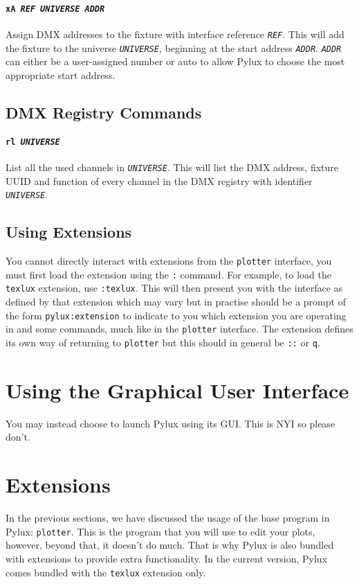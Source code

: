\documentclass[a4paper]{article}
\begin{document}
\paragraph{\texttt{xA \textit{REF UNIVERSE ADDR}}}
Assign DMX addresses to the fixture with interface reference 
\texttt{\textit{REF}}. This will add the fixture to the universe 
\texttt{\textit{UNIVERSE}}, beginning at the start address 
\texttt{\textit{ADDR}}. \texttt{\textit{ADDR}} can either be a user-assigned 
number or auto to allow Pylux to choose the most appropriate start address.

\subsection{DMX Registry Commands}

\paragraph{\texttt{rl \textit{UNIVERSE}}}
List all the used channels in \texttt{\textit{UNIVERSE}}. This will list the 
DMX address, fixture UUID and function of every channel in the DMX registry 
with identifier \texttt{\textit{UNIVERSE}}.

\subsection{Using Extensions}
You cannot directly interact with extensions from the \texttt{plotter} 
interface, you must first load the extension using the \texttt{:} command.
For example, to load the \texttt{texlux} extension, use \texttt{:texlux}. 
This will then present you with the interface as defined by that extension 
which may vary but in practise should be a prompt of the form 
\texttt{pylux:extension} to indicate to you which extension you are 
operating in and some commands, much like in the \texttt{plotter} interface.
The extension defines its own way of returning to \texttt{plotter} but this 
should in general be \texttt{::} or \texttt{q}.

\section{Using the Graphical User Interface}
You may instead choose to launch Pylux using its GUI. This is NYI so please 
don't.

\section{Extensions}
In the previous sections, we have discussed the usage of the base program in 
Pylux: \texttt{plotter}. This is the program that you will use to edit your
plots, however, beyond that, it doesn't do much. That is why Pylux is also 
bundled with extensions to provide extra functionality. In the current 
version, Pylux comes bundled with the \texttt{texlux} extension only.
\end{document}
